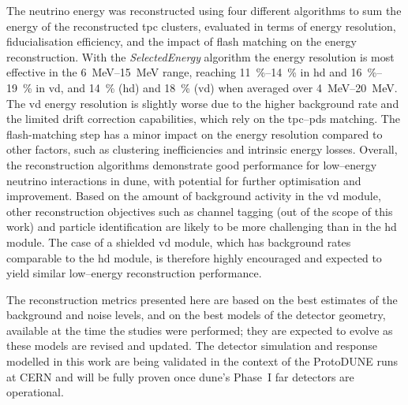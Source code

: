 The neutrino energy was reconstructed using four different algorithms to sum the energy of the reconstructed \gls{tpc} clusters, evaluated in terms of energy resolution, fiducialisation efficiency, and the impact of flash matching on the energy reconstruction. With the \textit{SelectedEnergy} algorithm the energy resolution is most effective in the \qtyrange{6}{15}{\mega\electronvolt} range, reaching \SIrange{11}{14}{\percent} in \gls{hd} and \SIrange{16}{19}{\percent} in \gls{vd}, and \SI{14}{\percent} (\gls{hd}) and \SI{18}{\percent} (\gls{vd}) when averaged over \qtyrange{4}{20}{\mega\electronvolt}. The \gls{vd} energy resolution is slightly worse due to the higher background rate and the limited drift correction capabilities, which rely on the \gls{tpc}--\gls{pds} matching. The flash-matching step has a minor impact on the energy resolution compared to other factors, such as clustering inefficiencies and intrinsic energy losses. Overall, the reconstruction algorithms demonstrate good performance for low--energy neutrino interactions in \gls{dune}, with potential for further optimisation and improvement. Based on the amount of background activity in the \gls{vd} module, other reconstruction objectives such as channel tagging (out of the scope of this work) and particle identification are likely to be more challenging than in the \gls{hd} module. The case of a shielded \gls{vd} module, which has background rates comparable to the \gls{hd} module, is therefore highly encouraged and expected to yield similar low--energy reconstruction performance.

The reconstruction metrics presented here are based on the best estimates of the background and noise levels, and on the best models of the detector geometry, available at the time the studies were performed; they are expected to evolve as these models are revised and updated. The detector simulation and response modelled in this work are being validated in the context of the ProtoDUNE runs at CERN and will be fully proven once \gls{dune}'s Phase~I far detectors are operational.
